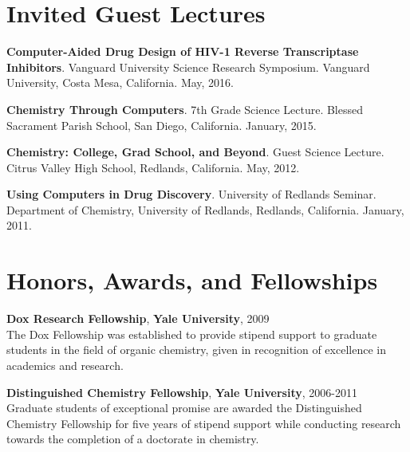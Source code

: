 \documentclass[10pt]{article}
\newcommand*\eduitem[4]{\textbf{#1}, \textbf{#2}, #3\\#4}
\newcommand*\lectitem[2]{\textbf{#1}. #2}
\begin{document}

\section{Invited Guest Lectures}

\lectitem{Computer-Aided Drug Design of HIV-1 Reverse Transcriptase Inhibitors}{Vanguard University Science Research Symposium. 
Vanguard University, Costa Mesa, California. May, 2016.}

\lectitem{Chemistry Through Computers}{7th Grade Science Lecture. Blessed Sacrament Parish School, San Diego, California. January, 2015.}

\lectitem{Chemistry: College, Grad School, and Beyond}{Guest Science Lecture. Citrus Valley High School, Redlands, California. May, 2012.}

\lectitem{Using Computers in Drug Discovery}{University of Redlands Seminar. Department of Chemistry, University of Redlands, Redlands, California. January, 2011.}


\section{Honors, Awards, and Fellowships}


\eduitem{Dox Research Fellowship}{Yale University}{2009}
{The Dox Fellowship was established to provide stipend support to graduate students 
in the field of organic chemistry, given in recognition of excellence in academics and research.}

\eduitem{Distinguished Chemistry Fellowship}{Yale University}{2006-2011}
{Graduate students of exceptional promise are awarded the Distinguished Chemistry Fellowship for five years of
stipend support while conducting research towards the completion of a doctorate in chemistry.}
\end{document}
